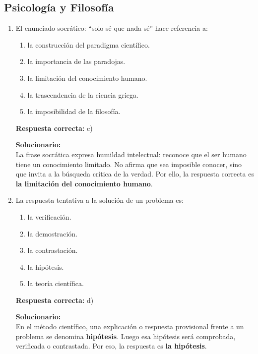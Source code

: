 \subsection*{Psicología y Filosofía}

\begin{enumerate}
	
	\item El enunciado socrático: ``solo sé que nada sé'' hace referencia a:
	\begin{enumerate}[label=\alph*)]
		\item la construcción del paradigma científico.
		\item la importancia de las paradojas.
		\item la limitación del conocimiento humano.
		\item la trascendencia de la ciencia griega.
		\item la imposibilidad de la filosofía.
	\end{enumerate}
	\textbf{Respuesta correcta:} c)
	
	\vspace{2mm}
	\textbf{Solucionario:}\\
	La frase socrática expresa humildad intelectual: reconoce que el ser humano tiene un conocimiento limitado. No afirma que sea imposible conocer, sino que invita a la búsqueda crítica de la verdad. Por ello, la respuesta correcta es \textbf{la limitación del conocimiento humano}.
	
	\vspace{6mm}
	
	\item La respuesta tentativa a la solución de un problema es:
	\begin{enumerate}[label=\alph*)]
		\item la verificación.
		\item la demostración.
		\item la contrastación.
		\item la hipótesis.
		\item la teoría científica.
	\end{enumerate}
	\textbf{Respuesta correcta:} d)
	
	\vspace{2mm}
	\textbf{Solucionario:}\\
	En el método científico, una explicación o respuesta provisional frente a un problema se denomina \textbf{hipótesis}. Luego esa hipótesis será comprobada, verificada o contrastada. Por eso, la respuesta es \textbf{la hipótesis}.
	

\end{enumerate}
